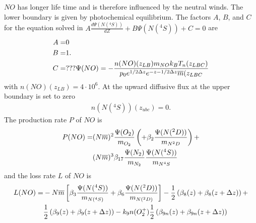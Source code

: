 %
$NO$ has longer life time and is therefore influenced by the neutral
winds. The lower boundary is given by photochemical equilibrium. The
factors $A$, $B$, and $C$ for the equation solved in  $A\frac{d \Psi(N(^4S))}{dZ} + B \Psi(N(^4S)) + C = 0$ are
%
\begin{align}
  A =& 0 \notag \\
  B =& 1. \notag \\
  C =&??? \Psi(NO)= -\frac{n(NO)(z_{LB}) m_{NO} k_B T_n(z_{LBC})}
  {p_0 e^{1/2 \Delta z} e^{-z -1/2 \Delta z}\overline{m}(z_{LBC}}
\end{align}
%
with $n(NO)(z_{LB}) = 4 \cdot 10^6$. At the upward diffusive flux at
the upper boundary is set to zero
%
\begin{align}
 n(N(^4S))(z_{ubc})= 0.
\end{align}
%
The production rate $P$ of $NO$ is
%
\begin{align}
 P(NO) = & (N\overline{m})^2 \frac{\Psi(O_2)}{m_{O_2}} \left(
    + \beta_2 \frac{\Psi(N(^2D))}{m_{N^2D}} \right) + \notag \\
  & (N\overline{m})^3 \beta_{17}\frac{\Psi(N_2)}{m_{N_2}}
   \frac{\Psi(N(^4S))}{m_{N^4S}}
\end{align}
%
and the loss rate $L$ of $NO$ is
%
\begin{align}
 L(NO) = & -N\overline{m} \left[ \beta_3 \frac{\Psi(N(^4S))}{m_{N(^4S)}}
   +  \beta_6 \frac{\Psi(N(^2D))}{m_{N(^2D)}}\right] -\frac{1}{2}
   \left( \beta_8(z) + \beta_8(z+\Delta z)  \right) + \notag \\
   & \frac{1}{2}
   \left( \beta_9(z) + \beta_9(z+\Delta z)  \right) - k_9 n(O_2^+)
   \frac{1}{2}
   \left( \beta_{9n}(z) + \beta_{9n}(z+\Delta z)  \right)
\end{align}
%
